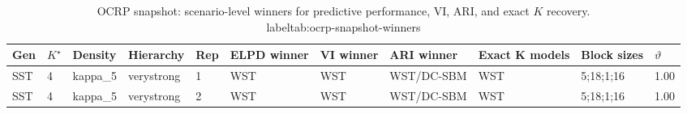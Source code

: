 \begin{table}[!h]
\centering
\caption{OCRP snapshot: scenario-level winners for predictive performance, VI, ARI, and exact $K$ recovery.\\label{tab:ocrp-snapshot-winners}}
\centering
\begin{tabular}[t]{lllllllllll}
\toprule
Gen & $K^\star$ & Density & Hierarchy & Rep & ELPD winner & VI winner & ARI winner & Exact K models & Block sizes & $\vartheta$\\
\midrule
SST & 4 & kappa_5 & verystrong & 1 & WST & WST & WST/DC-SBM & WST & 5;18;1;16 & 1.00\\
SST & 4 & kappa_5 & verystrong & 2 & WST & WST & WST/DC-SBM & WST & 5;18;1;16 & 1.00\\
\bottomrule
\end{tabular}
\end{table}
